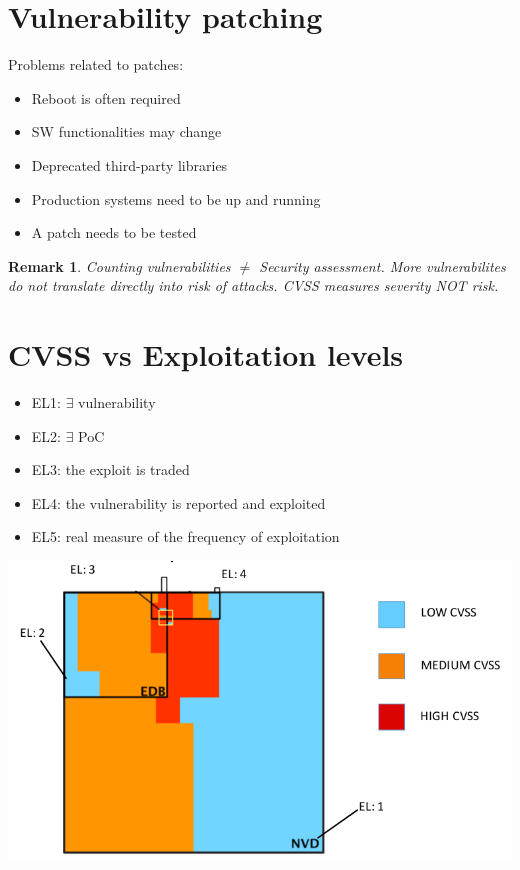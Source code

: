 \documentclass[10pt,a4paper]{book}
\newtheorem{remark}{Remark}
\begin{document}
\section{Vulnerability patching}
Problems related to patches: 
\begin{itemize}
\item Reboot is often required
\item SW functionalities may change
\item Deprecated third-party libraries
\item Production systems need to be up and running
\item A patch needs to be tested
\end{itemize}
\begin{remark}
Counting vulnerabilities $\neq$ Security assessment. More vulnerabilites do not translate directly into risk of attacks. CVSS measures severity NOT risk.
\end{remark}
\section{CVSS vs Exploitation levels}
\begin{itemize}
\item EL1: $\exists$ vulnerability 
\item EL2: $\exists$ PoC 
\item EL3: the exploit is traded
\item EL4: the vulnerability is reported and exploited
\item EL5: real measure of the frequency of exploitation
\end{itemize}
\includegraphics[scale=0.5]{comparison.png}
\end{document}
